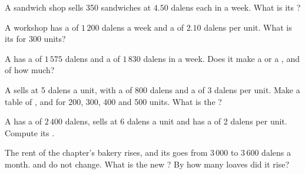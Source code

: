 \begin{exercise}[$\star$]\label{exo:g7:firms:2}
A sandwich shop sells 350 sandwiches at $4.50$ dalens each in a week. What is its ?
\end{exercise}

\begin{exercise}[$\star$]\label{exo:g7:firms:3}
A workshop has a  of $1\,200$ dalens a week and a  of $2.10$ dalens per
unit. What is its  for 300 units?
\end{exercise}

\begin{exercise}[$\star$]\label{exo:g7:firms:4}
A  has a  of $1\,575$ dalens and a  of $1\,830$ dalens in a week. Does it
make a  or a , and of how much?
\end{exercise}

\begin{exercise}[$\star\star$]\label{exo:g7:firms:5}
A  sells at 5 dalens a unit, with a  of 800 dalens and a  of 3 dalens
per unit. Make a table of ,  and  for 200, 300, 400 and 500 units. What is
the ?
\end{exercise}

\begin{exercise}[$\star\star$]\label{exo:g7:firms:6}
A  has a  of $2\,400$ dalens, sells at 6 dalens a unit and has a  of 2
dalens per unit. Compute its .
\end{exercise}

\begin{exercise}[$\star\star$]\label{exo:g7:firms:7}
The rent of the chapter's bakery rises, and its  goes from $3\,000$ to $3\,600$ dalens a
month.  and  do not change. What is the new ? By how many
loaves did it rise?
\end{exercise}

